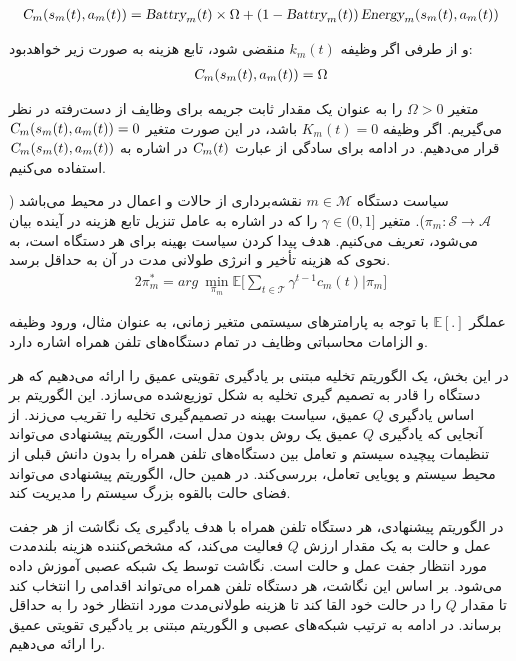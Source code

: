 \begin{alignat}{2}
	\textsl{C}_m(s_m(t),a_m(t)) =  \textsl{Battry}_m(t)  \times \Omega  +  (1-\textsl{Battry}_m(t)) \, \textsl{Energy}_m(s_m(t),a_m(t)) 
	\label{57}  
\end{alignat}



و از طرفی اگر وظیفه $k_m(t)$ منقضی شود، تابع هزینه به صورت زیر خواهدبود:
\begin{alignat}{2}
	\textsl{C}_m(s_m(t),a_m(t)) = \Omega
	\label{58}  
\end{alignat}

متغیر $\Omega > 0$ را به عنوان یک مقدار ثابت جریمه برای وظایف از دست‌رفته در نظر می‌گیریم. اگر وظیفه $K_m(t)=0$ باشد، در این صورت متغیر  $\textsl{C}_m(s_m(t),a_m(t))=0$ قرار می‌دهیم. در ادامه برای سادگی از عبارت $\textsl{C}_m(t)$ در اشاره به $\textsl{C}_m(s_m(t),a_m(t))$ استفاده می‌کنیم. 





سیاست دستگاه $m \in \mathcal{M}$ نقشه‌برداری از حالات و اعمال در محیط می‌باشد ($\pi_m : \mathcal{S} \rightarrow \mathcal{A}$). متغیر $\gamma \in (0,1]$ را که در اشاره به عامل تنزیل تابع هزینه در آینده بیان می‌شود، تعریف می‌کنیم. هدف پیدا کردن سیاست بهینه برای هر دستگاه است، به نحوی که هزینه تأخیر و انرژی طولانی مدت در آن به حداقل برسد. 
\begin{alignat}{2}
	\pi_m^* = arg\  \min\limits_{\pi_m}  \mathbb{E} \Bigg[ \sum\limits_{t \in \mathcal{T}}  \gamma^{t-1}c_m(t) \Bigg| \pi_m \Bigg]
	\label{59}  
\end{alignat}


عملگر $\mathbb{E}[.]$ با توجه به پارامترهای سیستمی متغیر زمانی، به عنوان مثال، ورود وظیفه و الزامات محاسباتی وظایف در تمام دستگاه‌های تلفن همراه اشاره دارد. 


در این بخش، یک الگوریتم تخلیه مبتنی بر یادگیری تقویتی عمیق را ارائه می‌دهیم که هر دستگاه را قادر به تصمیم گیری تخلیه به شکل توزیع‌شده می‌سازد. این الگوریتم بر اساس یادگیری $Q$ عمیق، سیاست بهینه در تصمیم‌گیری تخلیه را تقریب می‌زند. از آنجایی که یادگیری $Q$ عمیق یک روش بدون مدل است، الگوریتم پیشنهادی می‌تواند تنظیمات پیچیده سیستم و تعامل بین دستگاه‌های تلفن همراه را بدون دانش قبلی از محیط سیستم و پویایی تعامل، بررسی‌کند. در همین حال، الگوریتم پیشنهادی می‌تواند فضای حالت بالقوه بزرگ سیستم را مدیریت کند.

در الگوریتم پیشنهادی، هر دستگاه تلفن همراه با هدف یادگیری یک نگاشت از
هر جفت عمل و حالت به یک مقدار ارزش $Q$ فعالیت می‌کند، که مشخص‌کننده هزینه بلندمدت مورد انتظار جفت عمل و حالت است. نگاشت توسط یک شبکه عصبی آموزش داده می‌شود. بر اساس این نگاشت، هر دستگاه تلفن همراه می‌تواند اقدامی را انتخاب کند تا مقدار $Q$ را در حالت خود القا کند تا هزینه طولانی‌مدت مورد انتظار خود را به حداقل برساند. در ادامه به ترتیب شبکه‌های عصبی و الگوریتم مبتنی بر یادگیری تقویتی عمیق را ارائه می‌دهیم.


